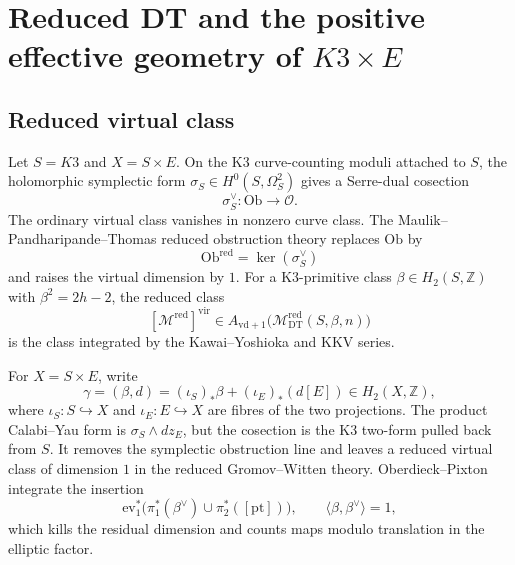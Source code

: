 \providecommand{\kch}{\kappa_{\mathrm{ch}}}
\providecommand{\kcat}{\kappa_{\mathrm{cat}}}
\providecommand{\kBKM}{\kappa_{\mathrm{BKM}}}
\providecommand{\kfib}{\kappa_{\mathrm{fiber}}}
\providecommand{\Mred}{\mathcal{M}^{\mathrm{red}}}
\providecommand{\virred}{[\Mred]^{\mathrm{vir}}}
\providecommand{\Auts}{\mathrm{Aut}_{s}}
\providecommand{\CoHA}{\mathrm{CoHA}}
\providecommand{\CoHAredpos}{\CoHA^{+}_{\mathrm{red}}}
\providecommand{\DT}{\mathsf{DT}}
\providecommand{\PhiOP}{\Phi_{10}^{\mathrm{OP}}}
\providecommand{\Dfive}{D_5}
\providecommand{\Deltafive}{\Delta_5}
\providecommand{\chiten}{\chi_{10}}

\section*{Reduced DT and the positive effective geometry of $K3\times E$}

\subsection*{Reduced virtual class}

Let \(S=K3\) and \(X=S\times E\).  On the K3 curve-counting moduli
attached to \(S\), the holomorphic symplectic form
\(\sigma_S\in H^0(S,\Omega^2_S)\) gives a Serre-dual cosection
\[
  \sigma_S^\vee:\mathrm{Ob}\longrightarrow \mathcal O.
\]
The ordinary virtual class vanishes in nonzero curve class.  The
Maulik--Pandharipande--Thomas reduced obstruction theory replaces
\(\mathrm{Ob}\) by
\[
  \mathrm{Ob}^{\mathrm{red}}=\ker(\sigma_S^\vee)
\]
and raises the virtual dimension by \(1\).  For a K3-primitive class
\(\beta\in H_2(S,\mathbb Z)\) with \(\beta^2=2h-2\), the reduced class
\[
  \virred\in
  A_{\mathrm{vd}+1}\bigl(\Mred_{\mathrm{DT}}(S,\beta,n)\bigr)
\]
is the class integrated by the Kawai--Yoshioka and KKV series.

For \(X=S\times E\), write
\[
  \gamma=(\beta,d)
  =
  (\iota_S)_*\beta+(\iota_E)_*(d[E])\in H_2(X,\mathbb Z),
\]
where \(\iota_S:S\hookrightarrow X\) and \(\iota_E:E\hookrightarrow X\)
are fibres of the two projections.  The product Calabi--Yau form is
\(\sigma_S\wedge dz_E\), but the cosection is the K3 two-form pulled
back from \(S\).  It removes the symplectic obstruction line and leaves
a reduced virtual class of dimension \(1\) in the reduced
Gromov--Witten theory.  Oberdieck--Pixton integrate the insertion
\[
  \mathrm{ev}_1^*
  \bigl(\pi_1^*(\beta^\vee)\cup\pi_2^*([\mathrm{pt}])\bigr),
  \qquad
  \langle \beta,\beta^\vee\rangle=1,
\]
which kills the residual dimension and counts maps modulo translation
in the elliptic factor.


